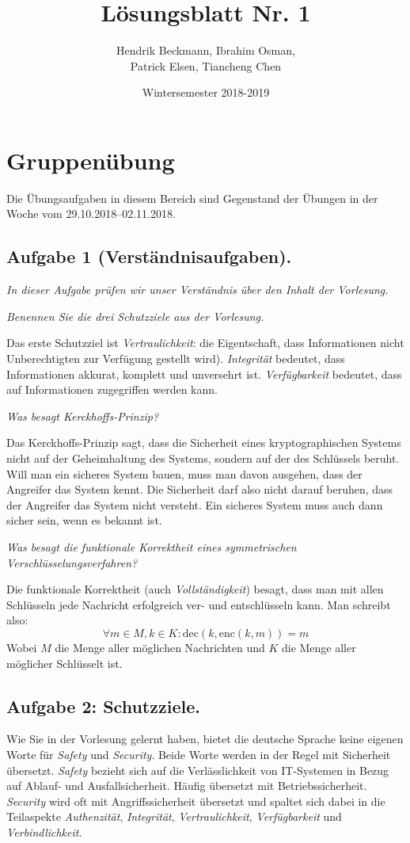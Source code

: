 \documentclass[
  ngerman,
  DIV=12
]{scrartcl}
\title{Lösungsblatt Nr. 1}
\date{Wintersemester 2018-2019}
\author{Hendrik Beckmann, Ibrahim Osman,\\Patrick Elsen, Tiancheng Chen}
\begin{document}
\maketitle

\section*{Gruppenübung}
Die Übungsaufgaben in diesem Bereich sind Gegenstand der Übungen in der Woche vom 29.10.2018–02.11.2018.

\subsection*{Aufgabe 1 (Verständnisaufgaben).} 
\emph{In dieser Aufgabe prüfen wir unser Verständnis über den Inhalt der Vorlesung.}

\medskip\noindent
\emph{Benennen Sie die drei Schutzziele aus der Vorlesung.}

\medskip\noindent
Das erste Schutzziel ist \emph{Vertraulichkeit}: die Eigentschaft, dass Informationen nicht Unberechtigten zur Verfügung gestellt wird). \emph{Integrität} bedeutet, dass Informationen akkurat, komplett und unversehrt ist. \emph{Verfügbarkeit} bedeutet, dass auf Informationen zugegriffen werden kann.

\bigskip\noindent
\emph{Was besagt Kerckhoffs-Prinzip?}

\medskip\noindent
Das Kerckhoffs-Prinzip sagt, dass die Sicherheit eines kryptographischen Systems nicht auf der Geheimhaltung des Systems, sondern auf der des Schlüssels beruht. Will man ein sicheres System bauen, muss man davon ausgehen, dass der Angreifer das System kennt. Die Sicherheit darf also nicht darauf beruhen, dass der Angreifer das System nicht versteht. Ein sicheres System muss auch dann sicher sein, wenn es bekannt ist. 

\bigskip\noindent
\emph{Was besagt die funktionale Korrektheit eines symmetrischen Verschlüsselungsverfahren?}

\medskip\noindent
Die funktionale Korrektheit (auch \emph{Vollständigkeit}) besagt, dass man mit allen Schlüsseln jede Nachricht erfolgreich ver- und entschlüsseln kann. Man schreibt also:
\begin{equation*}
\forall m \in M, k \in K: \textrm{dec}(k, \textrm{enc}(k, m)) = m  
\end{equation*}
Wobei $M$ die Menge aller möglichen Nachrichten und $K$ die Menge aller möglicher Schlüsselt ist.

\subsection*{Aufgabe 2: Schutzziele.}
Wie Sie in der Vorlesung gelernt haben, bietet die deutsche Sprache keine eigenen Worte für \emph{Safety} und \emph{Security}. Beide Worte werden in der Regel mit Sicherheit übersetzt.
\emph{Safety} bezieht sich auf die Verlässlichkeit von IT-Systemen in Bezug auf Ablauf- und Ausfallsicherheit. Häufig übersetzt mit Betriebssicherheit.
\emph{Security} wird oft mit Angriffssicherheit übersetzt und spaltet sich dabei in die Teilaspekte \emph{Authenzität}, \emph{Integrität}, \emph{Vertraulichkeit}, \emph{Verfügbarkeit} und \emph{Verbindlichkeit}. 
\end{document}
